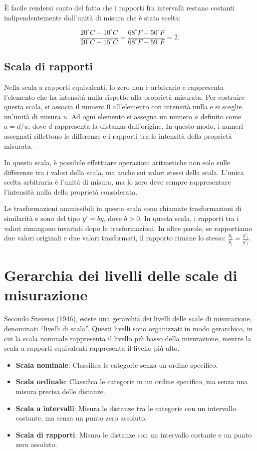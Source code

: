 \documentclass[
  letterpaper,
]{krantz}
\providecommand{\tightlist}{%
  \setlength{\itemsep}{0pt}\setlength{\parskip}{0pt}}\usepackage{longtable,booktabs,array}
\begin{document}
È facile rendersi conto del fatto che i rapporti fra intervalli restano
costanti indipendentemente dall'unità di misura che è stata scelta:

\[
  \frac{20^\circ C - 10^\circ C}{20^\circ C - 15^\circ C} =
  \frac{68^\circ F - 50^\circ F}{68^\circ F-59^\circ F} = 2.
\]

\subsection{Scala di rapporti}\label{scala-di-rapporti}

Nella scala a rapporti equivalenti, lo zero non è arbitrario e
rappresenta l'elemento che ha intensità nulla rispetto alla proprietà
misurata. Per costruire questa scala, si associa il numero 0
all'elemento con intensità nulla e si sceglie un'unità di misura \(u\).
Ad ogni elemento si assegna un numero \(a\) definito come \(a = d / u\),
dove \(d\) rappresenta la distanza dall'origine. In questo modo, i
numeri assegnati riflettono le differenze e i rapporti tra le intensità
della proprietà misurata.

In questa scala, è possibile effettuare operazioni aritmetiche non solo
sulle differenze tra i valori della scala, ma anche sui valori stessi
della scala. L'unica scelta arbitraria è l'unità di misura, ma lo zero
deve sempre rappresentare l'intensità nulla della proprietà considerata.

Le trasformazioni ammissibili in questa scala sono chiamate
trasformazioni di similarità e sono del tipo \(y' = by\), dove
\(b > 0\). In questa scala, i rapporti tra i valori rimangono invariati
dopo le trasformazioni. In altre parole, se rapportiamo due valori
originali e due valori trasformati, il rapporto rimane lo stesso:
\(\frac{y_i}{y_j} = \frac{y'_i}{y'_j}\).

\section{Gerarchia dei livelli delle scale di
misurazione}\label{gerarchia-dei-livelli-delle-scale-di-misurazione}

Secondo Stevens (1946), esiste una gerarchia dei livelli delle scale di
misurazione, denominati ``livelli di scala''. Questi livelli sono
organizzati in modo gerarchico, in cui la scala nominale rappresenta il
livello più basso della misurazione, mentre la scala a rapporti
equivalenti rappresenta il livello più alto.

\begin{itemize}
\tightlist
\item
  \textbf{Scala nominale}: Classifica le categorie senza un ordine
  specifico.
\item
  \textbf{Scala ordinale}: Classifica le categorie in un ordine
  specifico, ma senza una misura precisa delle distanze.
\item
  \textbf{Scala a intervalli}: Misura le distanze tra le categorie con
  un intervallo costante, ma senza un punto zero assoluto.
\item
  \textbf{Scala di rapporti}: Misura le distanze con un intervallo
  costante e un punto zero assoluto.
\end{itemize}
\end{document}

